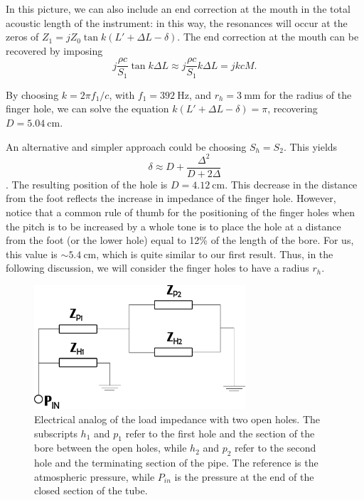 \documentclass[a4paper]{article}
\begin{document}
In this picture, we can also include an end correction at the mouth in the total acoustic length of the instrument: in this way, the resonances will occur at the zeros of $Z_1 = jZ_0 \tan k(L' + \Delta L - \delta)$. The end correction at the mouth can be recovered by imposing $$j \frac{\rho c}{S_1} \tan k\Delta L \approx j \frac{\rho c}{S_1} k\Delta L = jkcM. $$

By choosing $k = 2\pi f_1/c$, with $f_1 = 392~\si{\hertz}$, and $r_h = 3~\si{\milli\meter}$ for the radius of the finger hole, we can solve the equation $k(L' + \Delta L - \delta) = \pi$, recovering $D = 5.04~\si{\centi\meter}.$

An alternative and simpler approach could be choosing $S_h = S_2$. This yields $$ \delta \approx D + \frac{\Delta^2}{D +2\Delta}$$. The resulting position of the hole is $D = 4.12~\si{\centi\meter}$. This decrease in the distance from the foot reflects the increase in impedance of the finger hole. However, notice that a common rule of thumb for the positioning of the finger holes when the pitch is to be increased by a whole tone is to place the hole at a distance from the foot (or the lower hole) equal to 12\% of the length of the bore. For us, this value is $\sim 5.4~\si{\centi\meter}$, which is quite similar to our first result. Thus, in the following discussion, we will consider the finger holes to have a radius $r_h$.

\begin{figure}
	\centering
	\includegraphics[width=0.7\textwidth]{twoholes.pdf}
	\caption{Electrical analog of the load impedance with two open holes. The subscripts $h_1$ and $p_1$ refer to the first hole and the section of the bore between the open holes, while $h_2$ and $p_2$ refer to the second hole and the terminating section of the pipe. The reference is the atmospheric pressure, while $P_{in}$ is the pressure at the end of the closed section of the tube.}
	\label{fig:holes}
\end{figure}
\end{document}
